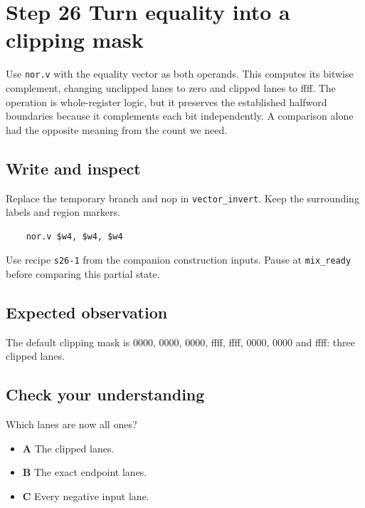 \section{Step 26 Turn equality into a clipping mask}\label{pcm-s26}

Use \texttt{nor.v} with the equality vector as both operands. This computes its bitwise complement, changing unclipped lanes to zero and clipped lanes to ffff. The operation is whole-register logic, but it preserves the established halfword boundaries because it complements each bit independently. A comparison alone had the opposite meaning from the count we need.

\subsection{Write and inspect}
Replace the temporary branch and nop in \texttt{vector\_invert}. Keep the surrounding labels and region markers.

\begin{verbatim}
    nor.v $w4, $w4, $w4
\end{verbatim}
Use recipe \texttt{s26-1} from the companion construction inputs. Pause at \texttt{mix\_ready} before comparing this partial state.

\subsection{Expected observation}
The default clipping mask is 0000, 0000, 0000, ffff, ffff, 0000, 0000 and ffff: three clipped lanes.

\subsection{Check your understanding}
Which lanes are now all ones?

\begin{itemize}
  \item \textbf{A} The clipped lanes.
  \item \textbf{B} The exact endpoint lanes.
  \item \textbf{C} Every negative input lane.
\end{itemize}
